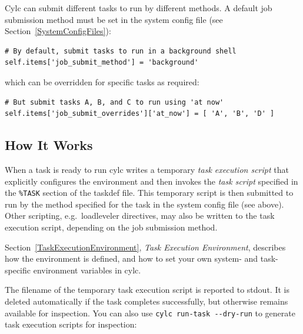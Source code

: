 \documentclass[11pt,a4paper]{article}
\begin{document}
Cylc can submit different tasks to run by different methods.  A default
job submission method must be set in the system config file (see
Section~\ref{SystemConfigFiles}):
 
\lstset{language=Python}

\begin{lstlisting}
# By default, submit tasks to run in a background shell
self.items['job_submit_method'] = 'background'
\end{lstlisting}
 
which can be overridden for specific tasks as required:

\begin{lstlisting}
# But submit tasks A, B, and C to run using 'at now'
self.items['job_submit_overrides']['at_now'] = [ 'A', 'B', 'D' ]
\end{lstlisting}

\subsection{How It Works}
\label{HowItWorks}

\lstset{language=cylctaskdef}

When a task is ready to run cylc writes a temporary {\em task execution
script} that explicitly configures the environment and then invokes the
{\em task script} specified in the \lstinline=%TASK= section of the
taskdef file. This temporary script is then submitted to run by the
method specified for the task in the system config file (see above).
Other scripting, e.g.\ loadleveler directives, may also be written to
the task execution script, depending on the job submission method.

\lstset{language=bash}

Section~\ref{TaskExecutionEnvironment}, {\em Task Execution
Environment}, describes how the environment is defined, and how to set
your own system- and task-specific environment variables in cylc.

The filename of the temporary task execution script is reported to
stdout. It is deleted automatically if the task completes successfully,
but otherwise remains available for inspection.  You can also use
\lstinline=cylc run-task --dry-run= to generate task
execution scripts for inspection:

\end{document}
